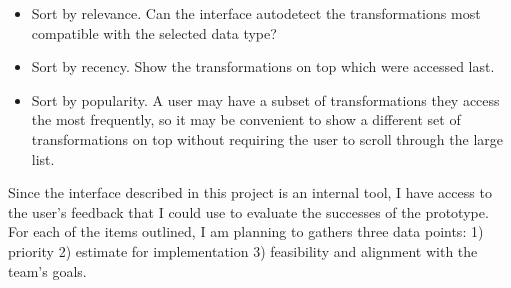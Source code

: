 \documentclass[12pt,letterpaper]{article}
\begin{document}
\begin{itemize}
    \item Sort by relevance. Can the interface autodetect the transformations most compatible with the selected data type?
    \item Sort by recency. Show the transformations on top which were accessed last.
    \item Sort by popularity. A user may have a subset of transformations they access the most frequently, so it may be convenient to show a different set of transformations on top without requiring the user to scroll through the large list. 
\end{itemize}

Since the interface described in this project is an internal tool, I have access to the user's feedback that I could use to evaluate the successes of the prototype. For each of the items outlined, I am planning to gathers three data points: 1) priority 2) estimate for implementation 3) feasibility and alignment with the team's goals.
\end{document}

